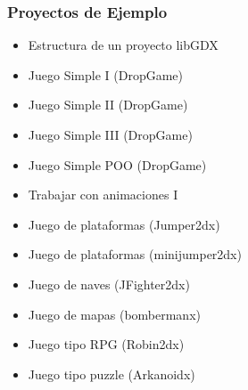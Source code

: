 \documentclass[xcolor={dvipsnames}]{beamer}
\begin{document}
\begin{frame}\frametitle{Proyectos de Ejemplo}
    \begin{itemize}
        \item Estructura de un proyecto libGDX \href{https://bitbucket.org/sfaci/java-libgdx/downloads/EstructuraProyectoLibgdx.zip}{}
        \item Juego Simple I (DropGame) \href{https://bitbucket.org/sfaci/libgdx/downloads/DropGame_v1.zip}{}
        \item Juego Simple II (DropGame) \href{https://bitbucket.org/sfaci/libgdx/downloads/DropGame_v2.zip}{}
        \item Juego Simple III (DropGame) \href{https://bitbucket.org/sfaci/libgdx/downloads/DropGame_v3.zip}{}
        \item Juego Simple POO (DropGame) \href{https://bitbucket.org/sfaci/libgdx/downloads/DropGame_POO.zip}{}
        \item Trabajar con animaciones I \href{https://bitbucket.org/sfaci/libgdx/downloads/animaciones.zip}{}
        \item Juego de plataformas (Jumper2dx) \href{https://bitbucket.org/sfaci/jumper2dx/downloads/jumper2dx-desktop_v0.2.jar}{}
        \item Juego de plataformas (minijumper2dx) \href{https://bitbucket.org/sfaci/minijumper2dx}{}
        \item Juego de naves (JFighter2dx) \href{https://bitbucket.org/sfaci/jfighter2dx/downloads/jfighter2dx-desktop_v1.jar}{}
        \item Juego de mapas (bombermanx) \href{https://bitbucket.org/sfaci/jbombermanx/downloads/jbombermanx_v0.1.jar}{}
        \item Juego tipo RPG (Robin2dx) \href{https://bitbucket.org/sfaci/java-libgdx/downloads/robin2dx.zip}{}
        \item Juego tipo puzzle (Arkanoidx) \href{https://bitbucket.org/sfaci/arkanoidx/downloads/arkanoidx-desktop_v0.1.jar}{}
    \end{itemize}
\end{frame}
\end{document}

